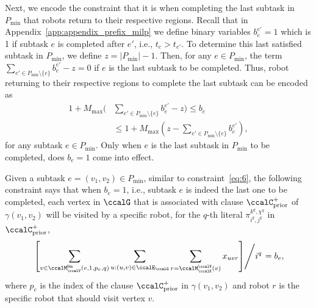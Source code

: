 \documentclass[Afour,sageh,times]{sagej}
\renewcommand{\ap}[3]{\mathcal{\pi}_{{#1},{#2}}^{#3}}
\begin{document}
{{{Next, we encode the constraint that it is when completing the last subtask in $P_{\text{min}}$ that robots return to their respective regions. Recall that in Appendix~\ref{app:appendix_prefix_milp} we define binary variables $b_{e}^{e'}=1$ which is 1 if subtask $e$ is completed after  $e'$, i.e., $t_e >  t_{e'}$. To determine this last satisfied subtask in $P_{\text{min}}$,
  we define $z = |P_{\text{min}}| -1$. Then, for any $e \in P_{\text{min}}$, the term $\sum_{e' \in  P_{\text{min}}\setminus \{e \} } b_{e}^{e'} - z  = 0$ if $e$ is the last subtask to be completed. Thus, robot returning to their respective regions to complete the last subtask  can be encoded as
\begin{align}\label{eq:lastsubtask}
  1 + M_{\text{max}} ( &  \sum_{e' \in  P_{\text{min}}\setminus \{e \} } b_{e}^{e'} - z)  \leq  b_e \nonumber \\
  & \leq 1 + M_{\text{max}} (z - \sum_{e' \in  P_{\text{min}}\setminus \{e \} } b_{e}^{e'}),
\end{align}
for any subtask $e \in P_{\text{min}}$. Only when $e$ is the last subtask in $P_{\text{min}}$ to be completed, does $b_e = 1$ come into effect.


Given a subtask $e = (v_1, v_2) \in P_{\text{min}}$, similar to constraint~\eqref{eq:6}, the following constraint says that when $b_e=1$, i.e., subtask $e$ is indeed the last one to be completed,  each vertex in $\ccalG$ that is associated with clause $\ccalC_{\text{prior}}^+$ of $\gamma(v_1, v_2)$ will be visited by a specific robot, for the $q$-th literal $\ap{i^q}{j^q}{k^q,\chi^q}$ in $\ccalC_{\text{prior}}^+$,
\begin{align}\label{eq:return_suffix}
  \left.   \left[ \sum_{v \in \ccalM_\ccalV^\mathsf{lits}(e, 1, p_e, q)}   \sum_{u: (u,v) \in \ccalE_\ccalG}     \sum_{r = \ccalM_{\ccalK}^\ccalV(v) }   x_{uvr} \right] \middle/ {i^q} \right. = b_e,
 \end{align}
where $p_e$ is the index of the clause $\ccalC_{\text{prior}}^+$ in $\gamma(v_1, v_2)$ and robot $r$ is the specific robot that should visit vertex $v$.

}}}
\end{document}
